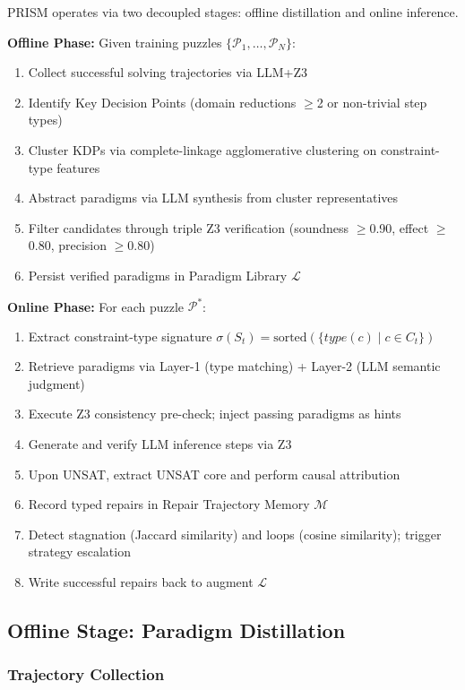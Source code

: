 PRISM operates via two decoupled stages: offline distillation and online inference.

\textbf{Offline Phase:} Given training puzzles $\{\mathcal{P}_1, \ldots, \mathcal{P}_N\}$:
\begin{enumerate}
    \item Collect successful solving trajectories via LLM+Z3
    \item Identify Key Decision Points (domain reductions $\geq$2 or non-trivial step types)
    \item Cluster KDPs via complete-linkage agglomerative clustering on constraint-type features
    \item Abstract paradigms via LLM synthesis from cluster representatives
    \item Filter candidates through triple Z3 verification (soundness $\geq$0.90, effect $\geq$0.80, precision $\geq$0.80)
    \item Persist verified paradigms in Paradigm Library $\mathcal{L}$
\end{enumerate}

\textbf{Online Phase:} For each puzzle $\mathcal{P}^*$:
\begin{enumerate}
    \item Extract constraint-type signature $\sigma(S_t) = \text{sorted}(\{type(c) \mid c \in C_t\})$
    \item Retrieve paradigms via Layer-1 (type matching) + Layer-2 (LLM semantic judgment)
    \item Execute Z3 consistency pre-check; inject passing paradigms as hints
    \item Generate and verify LLM inference steps via Z3
    \item Upon UNSAT, extract UNSAT core and perform causal attribution
    \item Record typed repairs in Repair Trajectory Memory $\mathcal{M}$
    \item Detect stagnation (Jaccard similarity) and loops (cosine similarity); trigger strategy escalation
    \item Write successful repairs back to augment $\mathcal{L}$
\end{enumerate}

\subsection{Offline Stage: Paradigm Distillation}

\subsubsection{Trajectory Collection}

